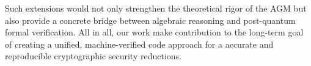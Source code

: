 Such extensions would not only strengthen the theoretical rigor of the AGM but also provide a concrete bridge between algebraic reasoning and post-quantum formal verification. All in all, our work make contribution to the long-term goal of creating a unified, machine-verified code approach for a accurate and reproducible cryptographic security reductions.
